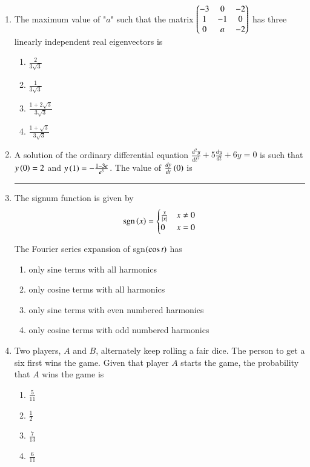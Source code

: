 \documentclass[journal,onecolumn]{IEEEtran}
\theoremstyle{remark}
\begin{document}
\begin{enumerate}
	\item The maximum value of "$a$" such that the matrix $\begin{pmatrix}-3 & 0 & -2\\1 & -1 & 0\\0 & a & -2\end{pmatrix}$ has three linearly independent real eigenvectors is

	\hfill{}
	\begin{enumerate}
		\item $\frac{2}{3\sqrt{3}}$
		\item $\frac{1}{3\sqrt{3}}$
		\item $\frac{1 + 2\sqrt{3}}{3\sqrt{3}}$
		\item $\frac{1 + \sqrt{3}}{3\sqrt{3}}$
	\end{enumerate}

    \item A solution of the ordinary differential equation $\frac{d^2y}{dt^2} + 5\frac{dy}{dt} + 6y = 0$ is such that $y\left(0\right) = 2$ and $y\left(1\right) = -\frac{1 - 3e}{e^3}$. The value of $\frac{dy}{dt}\left(0\right)$ is \rule{1cm}{0.15mm}
	\hfill{}

    \item The signum function is given by
	\begin{align*}
		\text{sgn}\left(x\right) =
		\begin{cases}
			\frac{x}{\left\vert x\right\vert} & x \neq 0\\
			0 & x = 0
		\end{cases}
	\end{align*}

	The Fourier series expansion of sgn$\left(\cos{t}\right)$ has
	\hfill{}

	\begin{enumerate}
		\item only sine terms with all harmonics
		\item only cosine terms with all harmonics
		\item only sine terms with even numbered harmonics
		\item only cosine terms with odd numbered harmonics
	\end{enumerate}

    \item Two players, $A$ and $B$, alternately keep rolling a fair dice. The person to get a six first wins the game. Given that player $A$ starts the game, the probability that $A$ wins the game is
	\hfill{}

	\begin{enumerate}
		\item $\frac{5}{11}$
		\item $\frac{1}{2}$
		\item $\frac{7}{13}$
		\item $\frac{6}{11}$
	\end{enumerate}

\end{enumerate}
\end{document}

